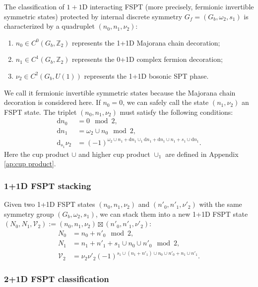 \documentclass[%
 reprint,
 amsmath,amssymb,
 aps,
prb,
]{revtex4-2}
\begin{document}
The classification of $1+1$D interacting FSPT (more precisely, fermionic invertible symmetric states) protected by internal discrete symmetry $G_f = (G_b, \omega_2, s_1)$ is characterized by a quadruplet $(n_0,n_1,\nu_2)$:  
\begin{enumerate}
\item  $n_0 \in C^0(G_b, \mathbb Z_2)$ represents the 1+1D Majorana chain decoration; 
\item  $n_1 \in C^1(G_b, \mathbb Z_2)$ represents the 0+1D complex fermion decoration;
\item  $\nu_2 \in C^2(G_b, U(1))$ represents the 1+1D bosonic SPT phase.
\end{enumerate}
We call it fermionic invertible symmetric states because the Majorana chain decoration is considered here.
If $n_0 = 0$, we can safely call the state $(n_1,\nu_2)$ an FSPT state.
The triplet $( n_{0} ,n_{1} ,\nu _{2})$ must satisfy the following conditions: 
\begin{align}
\mathrm{d} n_{0} &=0 \mod 2 ,\\
\mathrm{d} n_{1} &=\omega _{2} \cup n_{0} \mod 2 ,\\
\mathrm{d}_{s_1} \nu _{2} &=( -1)^{\omega _{2} \cup n_{1} +\mathrm{d} n_{1} \cup _{1}\mathrm{d} n_{1} +\mathrm{d} n_{1} \cup n_{1} + s_{1} \cup \mathrm{d} n_{1}} .
\end{align}
Here the cup product $\cup$ and higher cup product $\cup_1$ are defined in Appendix \ref{ap:cup product}.


\subsubsection{1+1D FSPT stacking}

Given two 1+1D FSPT states $( n_{0} ,n_{1} ,\nu _{2})$ and $( n'_{0} ,n'_{1} ,\nu '_{2})$ with the same symmetry group $( G_{b} ,\omega _{2} ,s_{1})$, we can stack them into a new 1+1D FSPT state $( N_{0} ,N_{1} ,\mathcal{V}_{2}):= (n_0,n_1,\nu_2) \boxtimes (n'_0,n'_1,\nu'_2)$: 
\begin{align}
N_{0} &=n_{0} +n'_{0} \mod 2 ,\\
N_{1} &=n_{1} +n'_{1} + s_{1} \cup n_{0} \cup n'_{0} \mod 2 ,\\
\mathcal{V}_{2} &=\nu _{2} \nu '_{2}( -1)^{s_{1} \cup ( n_{1} +n'_{1}) \cup n_{0} \cup n'_{0} +n_{1} \cup n'_{1}}  .
\end{align}


\subsubsection{2+1D FSPT classification}
\end{document}
